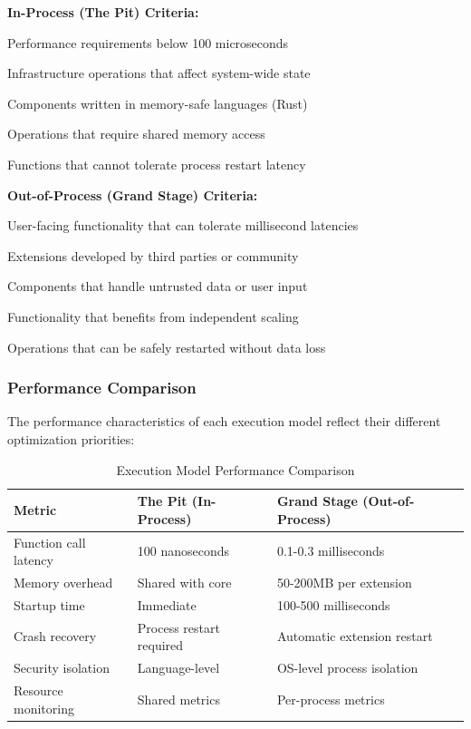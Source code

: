 \textbf{In-Process (The Pit) Criteria:}
\begin{compactlist}
    \item Performance requirements below 100 microseconds
    \item Infrastructure operations that affect system-wide state
    \item Components written in memory-safe languages (Rust)
    \item Operations that require shared memory access
    \item Functions that cannot tolerate process restart latency
\end{compactlist}

\textbf{Out-of-Process (Grand Stage) Criteria:}
\begin{compactlist}
    \item User-facing functionality that can tolerate millisecond latencies
    \item Extensions developed by third parties or community
    \item Components that handle untrusted data or user input
    \item Functionality that benefits from independent scaling
    \item Operations that can be safely restarted without data loss
\end{compactlist}

\subsubsection{Performance Comparison}

The performance characteristics of each execution model reflect their different optimization priorities:

\begin{table}[h]
\centering
\caption{Execution Model Performance Comparison}
\label{tab:execution-model-comparison}
\begin{tabular}{@{}lll@{}}
\toprule
\textbf{Metric} & \textbf{The Pit (In-Process)} & \textbf{Grand Stage (Out-of-Process)} \\
\midrule
Function call latency & 100 nanoseconds & 0.1-0.3 milliseconds \\
Memory overhead & Shared with core & 50-200MB per extension \\
Startup time & Immediate & 100-500 milliseconds \\
Crash recovery & Process restart required & Automatic extension restart \\
Security isolation & Language-level & OS-level process isolation \\
Resource monitoring & Shared metrics & Per-process metrics \\
\bottomrule
\end{tabular}
\end{table}

